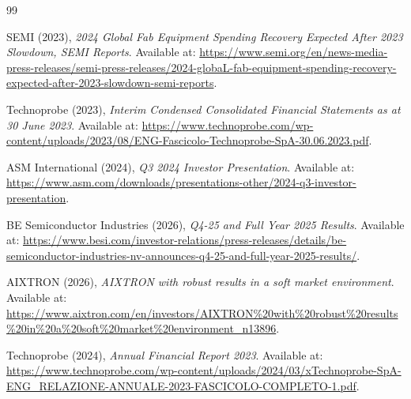 \documentclass[11pt,a4paper]{article}
\begin{document}
\begin{thebibliography}{99}
\small

SEMI (2023), \textit{2024 Global Fab Equipment Spending Recovery Expected After 2023 Slowdown, SEMI Reports}. Available at: \url{https://www.semi.org/en/news-media-press-releases/semi-press-releases/2024-globaL-fab-equipment-spending-recovery-expected-after-2023-slowdown-semi-reports}.

Technoprobe (2023), \textit{Interim Condensed Consolidated Financial Statements as at 30 June 2023}. Available at: \url{https://www.technoprobe.com/wp-content/uploads/2023/08/ENG-Fascicolo-Technoprobe-SpA-30.06.2023.pdf}.

ASM International (2024), \textit{Q3 2024 Investor Presentation}. Available at: \url{https://www.asm.com/downloads/presentations-other/2024-q3-investor-presentation}.

BE Semiconductor Industries (2026), \textit{Q4-25 and Full Year 2025 Results}. Available at: \url{https://www.besi.com/investor-relations/press-releases/details/be-semiconductor-industries-nv-announces-q4-25-and-full-year-2025-results/}.

AIXTRON (2026), \textit{AIXTRON with robust results in a soft market environment}. Available at: \url{https://www.aixtron.com/en/investors/AIXTRON%20with%20robust%20results%20in%20a%20soft%20market%20environment_n13896}.

Technoprobe (2024), \textit{Annual Financial Report 2023}. Available at: \url{https://www.technoprobe.com/wp-content/uploads/2024/03/xTechnoprobe-SpA-ENG_RELAZIONE-ANNUALE-2023-FASCICOLO-COMPLETO-1.pdf}.

\end{thebibliography}
\end{document}
